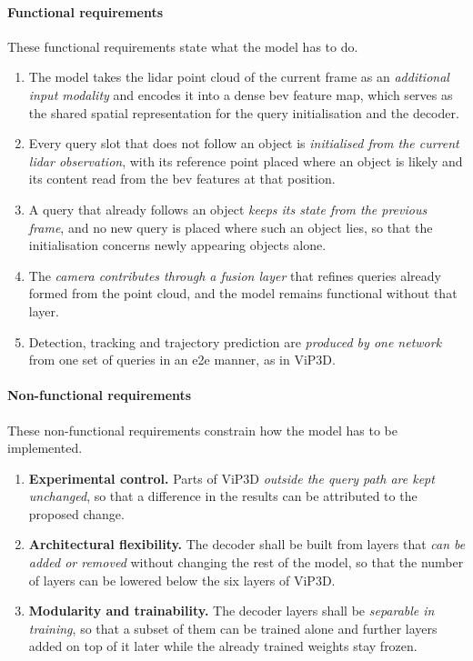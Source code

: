 \paragraph{Functional requirements}
\label{sec:design-fr}

These functional requirements state what the model has to do.

\begin{enumerate}[label=\textbf{FR\arabic*.}, ref=FR\arabic*, leftmargin=*]
    \item The model takes the \ac{lidar} point cloud of the current frame as an \emph{additional input
    modality} and encodes it into a dense \ac{bev} feature map, which serves as the shared spatial
    representation for the query initialisation and the decoder.
    \item Every query slot that does not follow an object is \emph{initialised from the current
    \ac{lidar} observation}, with its reference point placed where an object is likely and its content read
    from the \ac{bev} features at that position.
    \item A query that already follows an object \emph{keeps its state from the previous frame}, and
    no new query is placed where such an object lies, so that the initialisation concerns newly appearing
    objects alone.
    \item The \emph{camera contributes through a fusion layer}  that refines queries already
    formed from the point cloud, and the model remains functional without that layer.
    \item Detection, tracking and trajectory prediction are \emph{produced by one network} from one
    set of queries in an \acl{e2e} manner, as in ViP3D.
\end{enumerate}

\paragraph{Non-functional requirements}
\label{sec:design-nfr}

These non-functional requirements constrain how the model has to be implemented.

\begin{enumerate}[label=\textbf{NFR\arabic*.}, ref=NFR\arabic*, leftmargin=*]
    \item \textbf{Experimental control.} Parts of ViP3D \emph{outside the query path are kept unchanged}, so that a difference
    in the results can be attributed to the proposed change.
    \item \textbf{Architectural flexibility.} The decoder shall be built from layers that \emph{can be added or
    removed} without changing the rest of the model, so that the number of layers can be lowered below the six
    layers of ViP3D.
    \item \textbf{Modularity and trainability.} 
    The decoder layers shall be \emph{separable in training}, so that a subset of them can be trained 
    alone and further layers added on top of it later while the already trained weights stay frozen.
\end{enumerate}


